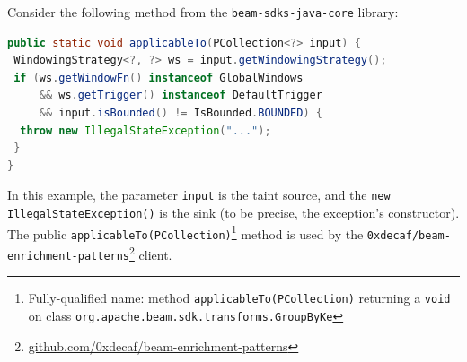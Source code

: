 Consider the following method from the \texttt{beam-sdks-java-core} library:

\begin{lstlisting}[language=Java]
public static void applicableTo(PCollection<?> input) {
 WindowingStrategy<?, ?> ws = input.getWindowingStrategy();
 if (ws.getWindowFn() instanceof GlobalWindows
     && ws.getTrigger() instanceof DefaultTrigger
     && input.isBounded() != IsBounded.BOUNDED) {
  throw new IllegalStateException("...");
 }
}
\end{lstlisting}







In this example, the parameter \texttt{input} is the taint source, and the \texttt{new IllegalStateException()} is the sink (to be precise, the exception's constructor). The public \texttt{applicableTo(PCollection)}\footnote{Fully-qualified name: method \texttt{applicableTo(PCollection)} returning a \texttt{void} on class \texttt{org.apache.beam.sdk.transforms.GroupByKe}} method is used by the \texttt{0xdecaf/beam-enrichment-patterns}\footnote{\url{github.com/0xdecaf/beam-enrichment-patterns}} client.

